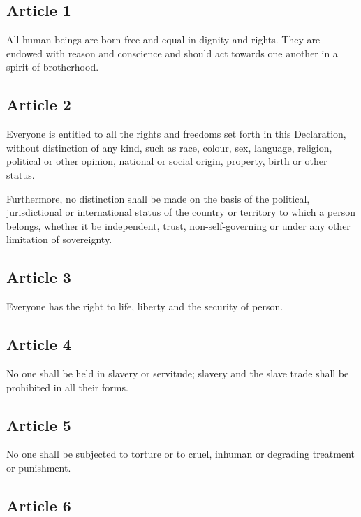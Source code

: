 \documentclass[
  titlepage,
  openright,
  DIV=calc,
  toc=listof,
  listof=nochaptergap]{scrbook}
\begin{document}
\subsection{Article 1}\label{article-1-4}

All human beings are born free and equal in dignity and rights. They are
endowed with reason and conscience and should act towards one another in
a spirit of brotherhood.

\subsection{Article 2}\label{article-2-4}

Everyone is entitled to all the rights and freedoms set forth in this
Declaration, without distinction of any kind, such as race, colour, sex,
language, religion, political or other opinion, national or social
origin, property, birth or other status.

Furthermore, no distinction shall be made on the basis of the political,
jurisdictional or international status of the country or territory to
which a person belongs, whether it be independent, trust,
non-self-governing or under any other limitation of sovereignty.

\subsection{Article 3}\label{article-3-4}

Everyone has the right to life, liberty and the security of person.

\subsection{Article 4}\label{article-4-4}

No one shall be held in slavery or servitude; slavery and the slave
trade shall be prohibited in all their forms.

\subsection{Article 5}\label{article-5-4}

No one shall be subjected to torture or to cruel, inhuman or degrading
treatment or punishment.

\subsection{Article 6}\label{article-6-4}
\end{document}
